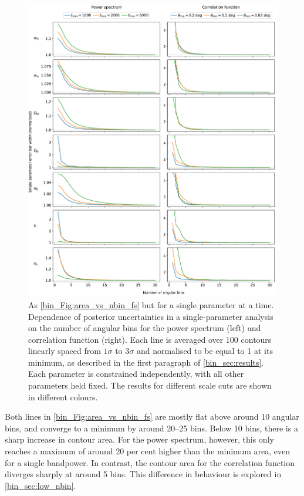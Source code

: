\begin{figure}[t!]
\includegraphics[width=\textwidth]{width_vs_nbin}
\caption{As \autoref{bin_Fig:area_vs_nbin_fs} but for a single parameter at a time. Dependence of posterior uncertainties in a single-parameter analysis on the number of angular bins for the power spectrum (left) and correlation function (right). Each line is averaged over 100 contours linearly spaced from $1\sigma$ to $3\sigma$ and normalised to be equal to 1 at its minimum, as described in the first paragraph of \autoref{bin_sec:results}. Each parameter is constrained independently, with all other parameters held fixed. The results for different scale cuts are shown in different colours.}
\label{bin_Fig:width_vs_nbin}
\end{figure}

Both lines in \autoref{bin_Fig:area_vs_nbin_fs} are mostly flat above around 10 angular bins, and converge to a minimum by around 20--25 bins. Below 10 bins, there is a sharp increase in contour area. For the power spectrum, however, this only reaches a maximum of around 20 per cent higher than the minimum area, even for a single bandpower. In contrast, the contour area for the correlation function diverges sharply at around 5 bins. This difference in behaviour is explored in \autoref{bin_sec:low_nbin}.

